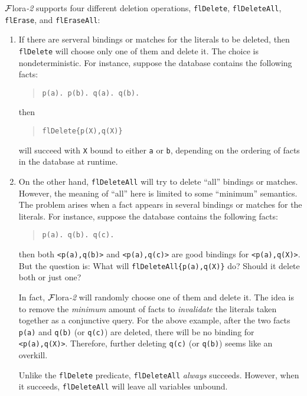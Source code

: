 \documentclass[11pt]{article}
\newcommand{\FLORA}{{\mbox{${\cal F}${\sc lora}\rm\emph{-2}}}\xspace}
\begin{document}
\FLORA supports four different deletion operations, {\tt flDelete},
{\tt flDeleteAll}, {\tt flErase}, and {\tt flEraseAll}:
\begin{enumerate}
\item If there are serveral bindings or matches for
      the literals to be deleted, then {\tt flDelete} will choose only
      one of them and delete it. The choice is nondeterministic.
      For instance, suppose the database contains the following facts:
      \begin{quote}
      \verb|p(a). p(b). q(a). q(b).|
      \end{quote}
      then
      \begin{quote}
      \verb|flDelete{p(X),q(X)}|
      \end{quote}
      will succeed with {\tt X} bound to either {\tt a} or {\tt b},
      depending on the ordering of facts in the database at runtime.

\item On the other hand, {\tt flDeleteAll} will try to delete ``all''
      bindings or matches. However, the meaning of ``all'' here is
      limited to some ``minimum'' semantics. The problem arises when
      a fact appears in several bindings or matches for the literals.
      For instance, suppose the database contains the following facts:
      \begin{quote}
      \verb|p(a). q(b). q(c).|
      \end{quote}
      then both \verb|<p(a),q(b)>| and \verb|<p(a),q(c)>| are good
      bindings for \verb|<p(a),q(X)>|. But the question is: What will
      \verb|flDeleteAll{p(a),q(X)}| do? Should it delete both or just one?

      \smallskip

      In fact, \FLORA will randomly choose one of them and delete it.
      The idea is to remove the \emph{minimum} amount of facts to
      \emph{invalidate} the literals taken together as a conjunctive
      query. For the above example, after the two facts {\tt p(a)} and
      {\tt q(b)} (or {\tt q(c)}) are deleted, there will be no binding for
      \verb|<p(a),q(X)>|. Therefore, further deleting {\tt q(c)}
      (or {\tt q(b)}) seems like an overkill.

      \smallskip

      Unlike the {\tt flDelete} predicate, {\tt flDeleteAll} \emph{always}
      succeeds. However, when it succeeds, {\tt flDeleteAll} will leave
      all variables unbound.


\end{enumerate}
\end{document}

